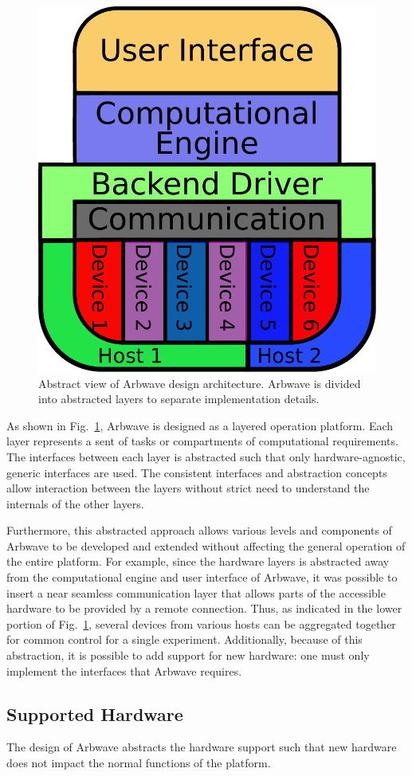\begin{figure}[ht!]
  \centerline{\includegraphics[width=.4\textwidth]{figures/design-layout}}
  \caption[Arbwave design architecture]{
    Abstract view of Arbwave design architecture.  Arbwave is divided into
    abstracted layers to separate implementation details.
  }
  \label{fig:intro:design}
\end{figure}

As shown in Fig.~\ref{fig:intro:design}, Arbwave is designed as a layered
operation platform.  Each layer represents a sent of tasks or compartments of
computational requirements.  The interfaces between each layer is abstracted
such that only hardware-agnostic, generic interfaces are used.  The consistent
interfaces and abstraction concepts allow interaction between the layers without
strict need to understand the internals of the other layers.

Furthermore, this abstracted approach allows various levels and components of
Arbwave to be developed and extended without affecting the general operation of
the entire platform.  For example, since the hardware layers is abstracted away
from the computational engine and user interface of Arbwave, it was possible to
insert a near seamless communication layer that allows parts of the accessible
hardware to be provided by a remote connection.  Thus, as indicated in the lower
portion of Fig.~\ref{fig:intro:design}, several devices from various hosts can
be aggregated together for common control for a single experiment.
Additionally, because of this abstraction, it is possible to add support for new
hardware: one must only implement the interfaces that Arbwave requires.


\subsection{Supported Hardware}\label{sec:hardware}

The design of Arbwave abstracts the hardware support such that new hardware does
not impact the normal functions of the platform.

